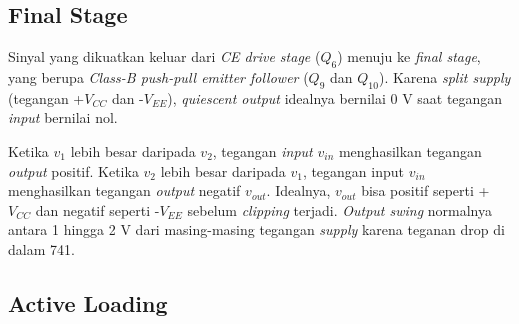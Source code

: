 \subsection{Final Stage}

Sinyal yang dikuatkan keluar dari \textit{CE drive stage} ($ Q_6 $) menuju ke \textit{final stage}, yang berupa \textit{Class-B push-pull emitter follower} ($ Q_9 $ dan $ Q_{10} $). Karena \textit{split supply} (tegangan +$ V_{CC} $ dan -$ V_{EE} $), \textit{quiescent output} idealnya bernilai 0 V saat tegangan \textit{input} bernilai nol.

Ketika $ v_1 $ lebih besar daripada $ v_2 $, tegangan \textit{input} $ v_{in} $ menghasilkan tegangan \textit{output} positif. Ketika $ v_2 $ lebih besar daripada $ v_1 $, tegangan input $ v_{in} $ menghasilkan tegangan \textit{output} negatif $ v_{out} $. Idealnya, $ v_{out} $ bisa positif seperti +$ V_{CC} $ dan negatif seperti -$ V_{EE} $ sebelum \textit{clipping} terjadi. \textit{Output swing} normalnya antara 1 hingga 2 V dari masing-masing tegangan \textit{supply} karena teganan drop di dalam 741.


\subsection{Active Loading}